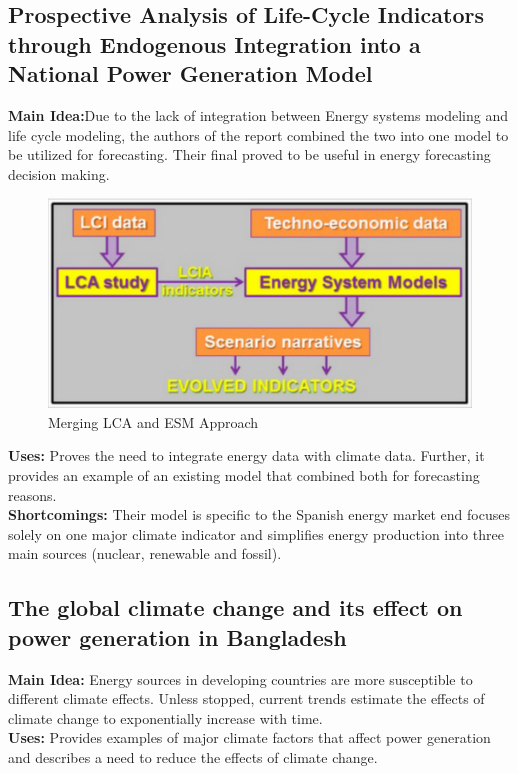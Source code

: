 \documentclass[sigconf,nonacm=true]{acmart}
\begin{document}
\subsection{Prospective Analysis of Life-Cycle Indicators through Endogenous Integration into a National Power Generation Model \cite[Page Count:~17]{Endogenous_resources5040039}}
\textbf{Main Idea:}Due to the lack of integration between Energy systems modeling and life cycle modeling, the authors of the report combined the two into one model to be utilized for forecasting. Their final proved to be useful in energy forecasting decision making.  \\
\begin{figure}[H]
	\centering
	\includegraphics[width=0.7\linewidth]{images/endogenousFig}
	\caption{Merging LCA and ESM Approach \protect\cite{Endogenous_resources5040039}}
	\label{fig:endogenous}
\end{figure}
\textbf{Uses:} Proves the need to integrate energy data with climate data. Further, it provides an example of an existing model that combined both for forecasting reasons.  \\

\textbf{Shortcomings:} Their model is specific to the Spanish energy market end focuses solely on one major climate indicator and simplifies energy production into three main sources (nuclear, renewable and fossil).  

\subsection{The global climate change and its effect on power generation in Bangladesh  \cite[Page Count:~10]{Bangladesh_KHAN20131460}}
\textbf{Main Idea:} Energy sources in developing countries are more susceptible to different climate effects. Unless stopped, current trends estimate the effects of climate change to exponentially increase with time. \\

\textbf{Uses:} Provides examples of major climate factors that affect power generation and describes a need to reduce the effects of climate change.  \\
\end{document}
